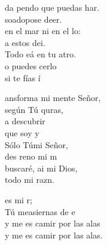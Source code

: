 \documentclass[12pt]{article}
\begin{document}
\begin{multicols*}{2}
\begin{cancion}%
	da  pendo que puedas har.\\
	  soadopose deer.\\
	en el mar ni en el lo: \\
	a estos dei.\\
	Todo eá en tu atro.\\
	o puedes cerlo\\
	si te fías í\\
\end{cancion}%

\begin{cancion}%
	ansforma mi mente Señor,\\
	según Tú quras,\\
	a descubrir\\
	que soy y\\
\jump
	Sólo Túmi Señor,\\
	des reno mi m\\
	 buscaré, ai mi Dios,\\
	 todo mi razn.\\
\end{cancion}%

\begin{cancion}%
	 es mi r;  \\
	Tú measiernas de e\\
	y me es camir por las alas\\
	y me es camir por las alas.\\
\end{cancion}%


\end{multicols*}
\end{document}
